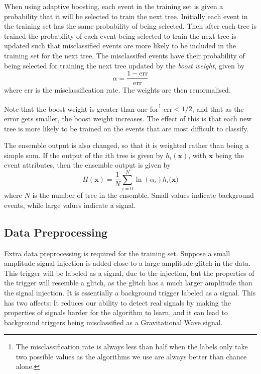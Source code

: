 \documentclass[12pt,twoside,a4paper]{report}
\begin{document}
When using adaptive boosting, each event in the training set is given a probability that it will be selected to train the next tree. Initially each event in the training set has the same probability of being selected. Then after each tree is trained the probability of each event being selected to train the next tree is updated such that misclassified events are more likely to be included in the training set for the next tree. The misclassifed events have their probability of being selected for training the next tree updated by the \textit{boost weight}, given by
\begin{equation}
\alpha = \frac{1 - \text{err}}{\text{err}} 
\end{equation}
where err is the misclassification rate. The weights are then renormalised. 

Note that the boost weight is greater than one for\footnote{The misclassification rate is always less than half when the labels only take two possible values as the algorithms we use are always better than chance alone.} err$< 1/2$, and that as the error gets smaller, the boost weight increases. The effect of this is that each new tree is more likely to be trained on the events that are most difficult to classify. 

The ensemble output is also changed, so that it is weighted rather than being a simple sum. If the output of the $i$th tree is given by $h_i(\textbf{x})$, with $\textbf{x}$ being the event attributes, then the ensemble output is given by
\begin{equation}
H(\textbf{x}) = \frac{1}{N}\sum_{i=0}^N \ln(\alpha_i)h_i(\textbf{x)}
\end{equation}  
where $N$ is the number of tree in the ensemble. Small values indicate background events, while large values indicate a signal. 

\subsection{Data Preprocessing}\label{data-preprocessing}
Extra data preprocessing is required for the training set. Suppose a small amplitude signal injection is added close to a large amplitude glitch in the data. This trigger will be labeled as a signal, due to the injection, but the properties of the trigger will resemble a glitch, as the glitch has a much larger amplitude than the signal injection. It is essentially a background trigger labeled as a signal. This has two affects: It reduces our ability to detect real signals by making the properties of signals harder for the algorithm to learn, and it can lead to background triggers being misclassified as a Gravitational Wave signal.  
\end{document}

